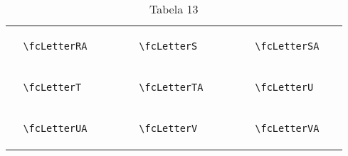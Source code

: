 \documentclass[x11names]{article}
\begin{document}
\begin{table}[H]
\begin{tabular}{|c|c|c|c|c|c|}
		&\multirow{5}{*}{	\fcLetterRA	[scale=0.4]} & &\multirow{5}{*}{	\fcLetterS	[scale=0.4]} & &\multirow{5}{*}{	\fcLetterSA	[scale=0.4]}\\	& & & & & \\	& & & & & \\	\verb|	\fcLetterRA	| & & \verb|	\fcLetterS	| & & \verb|	\fcLetterSA	| & \\	& & & & & \\	& & & & & \\	& & & & & \\	\hline									
		&\multirow{5}{*}{	\fcLetterT	[scale=0.4]} & &\multirow{5}{*}{	\fcLetterTA	[scale=0.4]} & &\multirow{5}{*}{	\fcLetterU	[scale=0.4]}\\	& & & & & \\	& & & & & \\	\verb|	\fcLetterT	| & & \verb|	\fcLetterTA	| & & \verb|	\fcLetterU	| & \\	& & & & & \\	& & & & & \\	& & & & & \\	\hline									
		&\multirow{5}{*}{	\fcLetterUA	[scale=0.4]} & &\multirow{5}{*}{	\fcLetterV	[scale=0.4]} & &\multirow{5}{*}{	\fcLetterVA	[scale=0.4]}\\	& & & & & \\	& & & & & \\	\verb|	\fcLetterUA	| & & \verb|	\fcLetterV	| & & \verb|	\fcLetterVA	| & \\	& & & & & \\	& & & & & \\	& & & & & \\		\hline 	\hline 	\end{tabular}	\caption{	Tabela 13	}\label{	Tab13	}\end{table}
\end{document}

